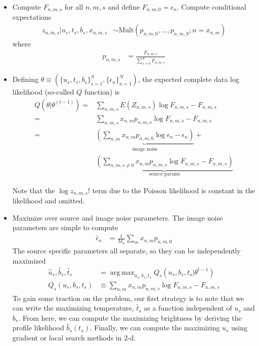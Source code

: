 \documentclass[11pt]{article}
\DeclareMathOperator*{\argmax}{arg\,max}
\begin{document}
\begin{itemize}
\item Compute $F_{n,m,s}$ for all $n,m,s$ and define $F_{n,m,0} = \epsilon_n$.  Compute conditional expectations  
\begin{align}
  z_{n,m,s} | u_s, t_s, b_s, x_{n,m,s}
    &\sim \textrm{Mult}(p_{n,m,0}, \dots, p_{n,m,S}; n = x_{n,m})
  \label{eq:mult}
\end{align}
where 
\begin{align}
  p_{n,m,s} &= \frac{F_{n,m,s}}{\sum_{s=0}^S F_{n,m,s}}
\end{align}

\item Defining $\theta \equiv (\{u_s, t_s, b_s\}_{s=1}^S, \{ \epsilon_n \}_{n=1}^N) $, the expected complete data log likelihood (so-called $Q$ function) is
\begin{align}
  Q(\theta | \theta^{(t-1)})
    =& \sum_{n,m,s} E(Z_{n,m,s}) \log F_{n,m,s} - F_{n,m,s} \\
    =& \sum_{n,m,s} x_{n,m} p_{n,m,s} \log F_{n,m,s} - F_{n,m,s} \\
    =& \underbrace{\left( \sum_{n,m} x_{n,m} p_{n,m,0} \log \epsilon_n - \epsilon_n \right)}_{\text{image noise}} + \\
     & \underbrace{\left(\sum_{n,m,s\neq 0} x_{n,m} p_{n,m,s} \log F_{n,m,s} - F_{n,m,s}\right)}_{\text{source params}}
\end{align}

Note that the $\log z_{n,m,s}!$ term due to the Poisson likelihood is constant in the likelihood and omitted. 

\item Maximize over source and image noise parameters.  The image noise parameters are simple to compute
\begin{align}
  \hat \epsilon_n &= \frac{1}{M_n} \sum_{m} x_{n,m} p_{n,m,0}
\end{align}
The source specific parameters all separate, so they can be independently maximized
\begin{align}
  \hat u_s, \hat b_s, \hat t_s &= \argmax_{u_s, b_s, t_s} Q_s(u_s, b_s, t_s | \theta^{t-1}) \\
  Q_s(u_s, b_s, t_s) &\equiv \sum_{n,m} x_{n,m} p_{n,m,s} \log F_{n,m,s} - F_{n,m,s}
\end{align}
To gain some traction on the problem, our first strategy is to note that we can write the maximizing temperature, $\hat t_s$ as a function independent of $u_s$ and $b_s$.  From here, we can compute the maximizing brightness by deriving the profile likelihood $\hat b_s(t_s)$.  Finally, we can compute the maximizing $u_s$ using gradient or local search methods in 2-d.  


\end{itemize}
\end{document}
